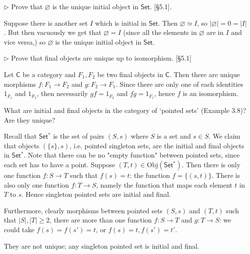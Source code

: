\documentclass[12pt,letterpaper,boxed]{hmcpset}
\newcommand{\Obj}{\mathrm{Obj}}
\newcommand{\Set}{\mathsf{Set}}
\newcommand{\C}{\mathbb{C}}
\newcommand{\abs}[1]{\left|#1\right|}
\begin{document}
\begin{problem}[5.2]
	\def \Set {\mathsf{Set}}
	$\rhd$ Prove that $\varnothing$ is the unique initial object in $\Set$. [\S 5.1].
\end{problem}
\begin{solution}
	\def \Set {\mathsf{Set}}
	Suppose there is another set $I$ which is initial in $\Set$. Then
	$\varnothing\simeq I$, so $\abs{\varnothing} = 0 = \abs{I}$. But then vacuously we
	get that $\varnothing = I$ (since all the elements in $\varnothing$ are in $I$ and
	vice versa,) so $\varnothing$ is the unique initial object in $\Set$.
\end{solution}


\begin{problem}[5.3]
	$\rhd$ Prove that final objects are unique up to isomorphism. [\S 5.1]
\end{problem}
\begin{solution}
	\def \C {\mathsf{C}}
	Let $\C$ be a category and $F_1,F_2$ be two final objects in $\C$. Then there
	are unique morphisms $f:F_1\to F_2$ and $g:F_2\to F_1$. Since there are only one
	of each identities $1_{F_1}$ and $1_{F_2}$, then necessarily $gf = 1_{F_2}$ and
	$fg = 1_{F_1}$, hence $f$ is an isomorphism.
\end{solution}


\begin{problem}[5.4]
	What are initial and final objects in the category of `pointed sets' (Example
	3.8)? Are they unique?
\end{problem}
\begin{solution}
	Recall that $\mathsf{{Set^*}}$ is the set of pairs $(S,s)$ where $S$ is a set and $s\in S$.
	We claim that objects $(\{s\},s)$, i.e. pointed singleton sets, are the initial
	and final objects in $\mathsf{{Set^*}}$. Note that there can be no "empty function" between
	pointed sets, since each set has to have a point. Suppose $(T,t)\in\Obj(\mathsf{{Set^*}})$.
	Then there is only one function $f:S\to T$ such that $f(s)=t$: the function
	$f=\{(s,t)\}$. There is also only one function $f:T\to S$, namely the function
	that maps each element $t$ in $T$ to $s$. Hence singleton pointed sets are
	initial and final.
	
	Furthermore, clearly morphisms between pointed sets $(S,s)$ and $(T,t)$ such
	that $\abs{S},\abs{T}\geq 2$, there are more than one function $f:S\to T$ and
	$g:T\to S$: we could take $f(s)=f(s')=t$, or $f(s)=t,f(s')=t'$.
	
	They are not unique; any singleton pointed set is initial and final.
\end{solution}
\end{document}
